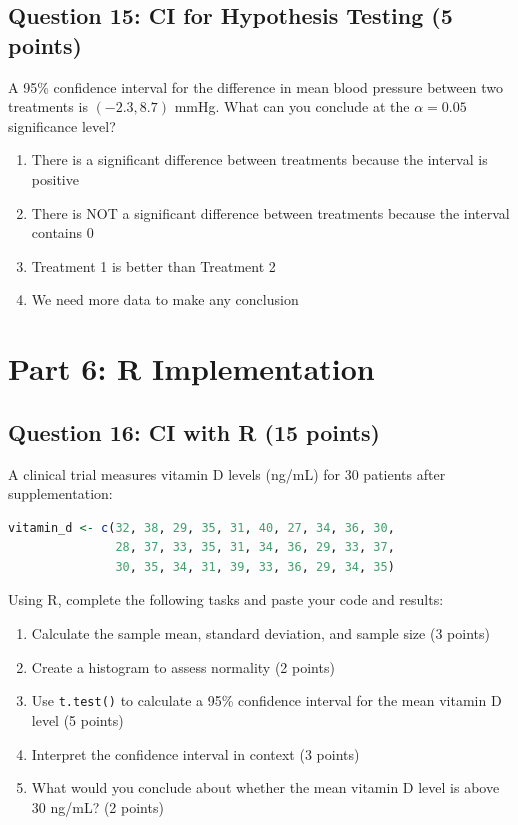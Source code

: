\documentclass[11pt]{article}
\begin{document}
\subsection*{Question 15: CI for Hypothesis Testing (5 points)}

A 95\% confidence interval for the difference in mean blood pressure between two treatments is $(-2.3, 8.7)$ mmHg. What can you conclude at the $\alpha = 0.05$ significance level?

\begin{enumerate}[label=\alph*)]
\item There is a significant difference between treatments because the interval is positive
\item There is NOT a significant difference between treatments because the interval contains 0
\item Treatment 1 is better than Treatment 2
\item We need more data to make any conclusion
\end{enumerate}

\section*{Part 6: R Implementation}

\subsection*{Question 16: CI with R (15 points)}

A clinical trial measures vitamin D levels (ng/mL) for 30 patients after supplementation:

\begin{lstlisting}[language=R, basicstyle=\small\ttfamily]
vitamin_d <- c(32, 38, 29, 35, 31, 40, 27, 34, 36, 30,
               28, 37, 33, 35, 31, 34, 36, 29, 33, 37,
               30, 35, 34, 31, 39, 33, 36, 29, 34, 35)
\end{lstlisting}

Using R, complete the following tasks and paste your code and results:
\begin{enumerate}[label=\alph*)]
\item Calculate the sample mean, standard deviation, and sample size (3 points)
\item Create a histogram to assess normality (2 points)
\item Use \texttt{t.test()} to calculate a 95\% confidence interval for the mean vitamin D level (5 points)
\item Interpret the confidence interval in context (3 points)
\item What would you conclude about whether the mean vitamin D level is above 30 ng/mL? (2 points)
\end{enumerate}
\end{document}
